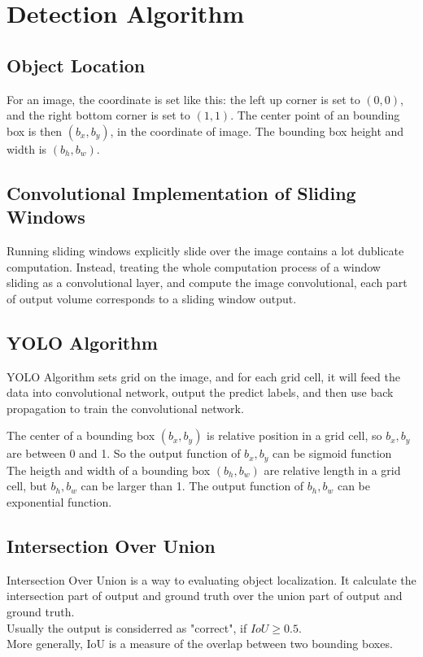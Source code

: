 \documentclass{article}
\begin{document}
	\section{Detection Algorithm}
	\subsection{Object Location}
	\begin{flushleft}
		For an image, the coordinate is set like this: the left up corner is set to $(0,0)$, and the right bottom corner is set to $(1,1)$. The center point of an bounding box is then $(b_x,b_y)$, in the coordinate of image. The bounding box height and width is $(b_h,b_w)$.
	\end{flushleft}
	\subsection{Convolutional Implementation of Sliding Windows}
	\begin{flushleft}
		Running sliding windows explicitly slide over the image contains a lot dublicate computation. Instead, treating the whole computation process of a window sliding as a convolutional layer, and compute the image convolutional, each part of output volume corresponds to a sliding window output.
	\end{flushleft}
	\subsection{YOLO Algorithm}
	\begin{flushleft}
		YOLO Algorithm sets grid on the image, and for each grid cell, it will feed the data into convolutional network, output the predict labels, and then use back propagation to train the convolutional network.
	\end{flushleft}
	\begin{flushleft}
		The center of a bounding box $(b_x, b_y)$ is relative position in a grid cell, so $b_x, b_y$ are between 0 and 1. So the output function of $b_x, b_y$ can be sigmoid function\\
		The heigth and width of a bounding box $(b_h, b_w)$ are relative length in a grid cell, but $b_h, b_w$ can be larger than 1. The output function of $b_h, b_w$ can be exponential function.
	\end{flushleft}
	\subsection{Intersection Over Union}
	\begin{flushleft}
		Intersection Over Union is a way to evaluating object localization. It calculate the intersection part of output and ground truth over the union part of output and ground truth.\\ Usually the output is considerred as "correct", if $IoU \geq 0.5$.\\
		More generally, IoU is a measure of the overlap between two bounding boxes.
	\end{flushleft}
\end{document}
